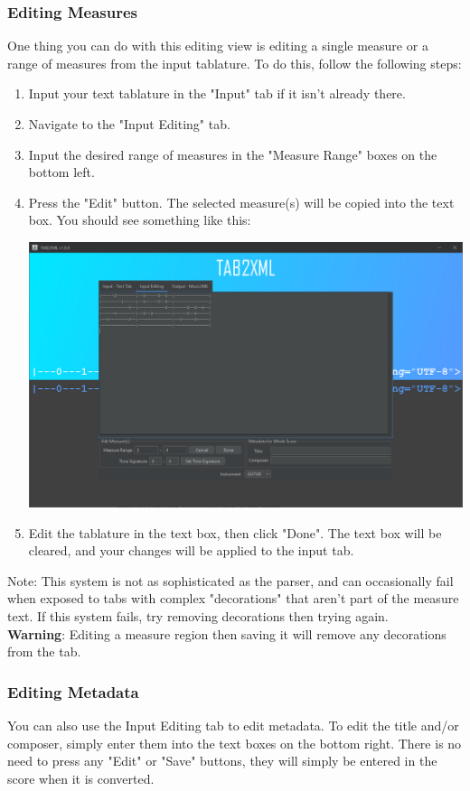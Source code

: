 \documentclass[11pt]{article}
\begin{document}
\subsubsection{Editing Measures}
\label{sec:orgaa7660e}
One thing you can do with this editing view is editing a single measure or a range of measures from the input tablature.  To do this, follow the following steps:
\begin{enumerate}
\item Input your text tablature in the "Input" tab if it isn't already there.
\item Navigate to the "Input Editing" tab.
\item Input the desired range of measures in the "Measure Range" boxes on the bottom left.
\item Press the "Edit" button.  The selected measure(s) will be copied into the text box.  You should see something like this:
\begin{center}
\includegraphics[width=.9\linewidth]{../Screenshots/sample-input-editing-tabbedview.png}
\end{center}
\item Edit the tablature in the text box, then click "Done".  The text box will be cleared, and your changes will be applied to the input tab.
\end{enumerate}

Note: This system is not as sophisticated as the parser, and can occasionally fail when exposed to tabs with complex "decorations" that aren't part of the measure text.  If this system fails, try removing decorations then trying again. \\
\textbf{Warning}: Editing a measure region then saving it will remove any decorations from the tab.
\subsubsection{Editing Metadata}
\label{sec:org56836be}
You can also use the Input Editing tab to edit metadata.  To edit the title and/or composer, simply enter them into the text boxes on the bottom right.  There is no need to press any "Edit" or "Save" buttons, they will simply be entered in the score when it is converted.
\end{document}
